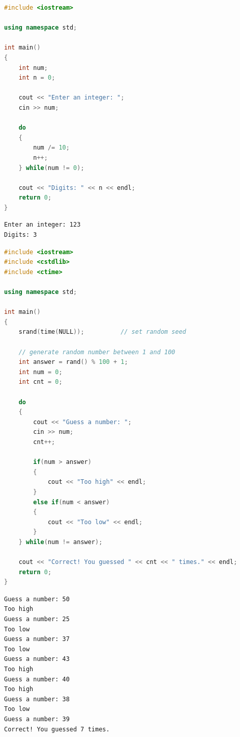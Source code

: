 \vspace{0.5cm}


\begin{lstlisting}[language=C++]
#include <iostream>

using namespace std;

int main()
{
    int num;
    int n = 0;

    cout << "Enter an integer: ";
    cin >> num;

    do
    {
        num /= 10;
        n++;
    } while(num != 0);

    cout << "Digits: " << n << endl;
    return 0;
}
\end{lstlisting}

\begin{tcolorbox}
    \begin{verbatim}
Enter an integer: 123
Digits: 3
\end{verbatim}
\end{tcolorbox}

\vspace{0.5cm}


\begin{lstlisting}[language=C++]
#include <iostream>
#include <cstdlib>
#include <ctime>

using namespace std;

int main()
{
    srand(time(NULL));          // set random seed

    // generate random number between 1 and 100
    int answer = rand() % 100 + 1;
    int num = 0;
    int cnt = 0;

    do
    {
        cout << "Guess a number: ";
        cin >> num;
        cnt++;
        
        if(num > answer)
        {
            cout << "Too high" << endl;
        }
        else if(num < answer)
        {
            cout << "Too low" << endl;
        }
    } while(num != answer);

    cout << "Correct! You guessed " << cnt << " times." << endl;
    return 0;
}
\end{lstlisting}

\begin{tcolorbox}
    \begin{verbatim}
Guess a number: 50
Too high
Guess a number: 25
Too low
Guess a number: 37
Too low
Guess a number: 43
Too high
Guess a number: 40
Too high
Guess a number: 38
Too low
Guess a number: 39
Correct! You guessed 7 times.
\end{verbatim}
\end{tcolorbox}


